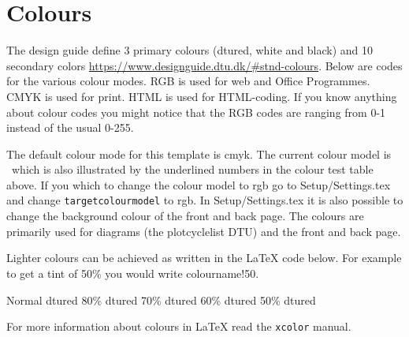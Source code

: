 \chapter{Colours} \label{sec:colours}
The design guide define 3 primary colours (dtured, white and black)
and 10 secondary colors
\url{https://www.designguide.dtu.dk/#stnd-colours}. Below are codes
for the various colour modes. RGB is used for web and Office
Programmes. CMYK is used for print. HTML is used for HTML-coding. If
you know anything about colour codes you might notice that the RGB
codes are ranging from 0-1 instead of the usual 0-255.

\begin{testcolors}
\end{testcolors}

The default colour mode for this template is cmyk. The current colour
model is \targetcolourmodel~which is also illustrated by the
underlined numbers in the colour test table above.  If you which to
change the colour model to rgb go to Setup/Settings.tex and change
\texttt{targetcolourmodel} to rgb. In Setup/Settings.tex it is also
possible to change the background colour of the front and back page.
The colours are primarily used for diagrams (the plotcyclelist DTU)
and the front and back page.

Lighter colours can be achieved as written in the \LaTeX{} code
below. For example to get a tint of 50\% you would write
colourname!50.  \newline
{\raggedright
  \textcolor{dtured}{Normal dtured} \qquad
  \textcolor{dtured!80}{80\% dtured} \qquad
  \textcolor{dtured!70}{70\% dtured} \qquad
  \textcolor{dtured!60}{60\% dtured} \qquad
  \textcolor{dtured!50}{50\% dtured}
}
\newline
For more information about colours in \LaTeX{} read the \texttt{xcolor} manual.
